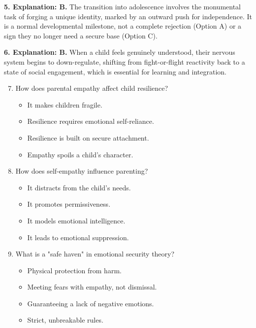 \begin{practiceexercise}
\textbf{5. Explanation: B.} The transition into adolescence involves the monumental task of forging a unique identity, marked by an outward push for independence. It is a normal developmental milestone, not a complete rejection (Option A) or a sign they no longer need a secure base (Option C).

\textbf{6. Explanation: B.} When a child feels genuinely understood, their nervous system begins to down-regulate, shifting from fight-or-flight reactivity back to a state of social engagement, which is essential for learning and integration.
\newpage

\begin{enumerate}
    \setcounter{enumi}{6}
    \item How does parental empathy affect child resilience?
    \begin{itemize}
        \item[A)] It makes children fragile.
        \item[B)] Resilience requires emotional self-reliance.
        \item[C)] Resilience is built on secure attachment.
        \item[D)] Empathy spoils a child's character.
    \end{itemize}
    \vspace{\fill}
  \item How does self-empathy influence parenting?
    \begin{itemize}
        \item[A)] It distracts from the child's needs.
        \item[B)] It promotes permissiveness.
        \item[C)] It models emotional intelligence.
        \item[D)] It leads to emotional suppression.
    \end{itemize}
    \vspace{\fill}
  \item What is a "safe haven" in emotional security theory?
    \begin{itemize}
        \item[A)] Physical protection from harm.
        \item[B)] Meeting fears with empathy, not dismissal.
        \item[C)] Guaranteeing a lack of negative emotions.
        \item[D)] Strict, unbreakable rules.
    \end{itemize}
\end{enumerate}
\vspace{\fill}


\end{practiceexercise}
